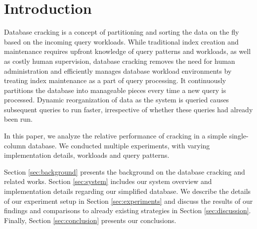 \section{Introduction}

Database cracking is a concept of partitioning and sorting the data on the fly based on the incoming query workloads. While traditional index creation and maintenance requires upfront knowledge of query patterns and workloads, as well as costly human supervision, database cracking removes the need for human administration and efficiently manages database workload environments by treating index maintenance as a part of query processing. It continuously partitions the database into manageable pieces every time a new query is processed. Dynamic reorganization of data as the system is queried causes subsequent queries to run faster, irrespective of whether these queries had already been run.

In this paper, we analyze the relative performance of cracking in a simple single-column database. We conducted multiple experiments, with varying implementation details, workloads and query patterns. 

Section \ref{sec:background} presents the background on the database cracking and related works. Section \ref{sec:system} includes our system overview and implementation details regarding our simplified database. We describe the details of our experiment setup in Section \ref{sec:experiments} and discuss the results of our findings and comparisons to already existing strategies in Section \ref{sec:discussion}. Finally, Section \ref{sec:conclusion} presents our conclusions.

\label{sec:introduction}
